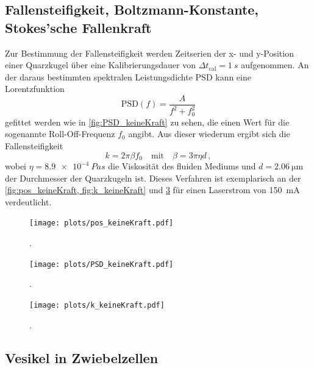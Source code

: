 \subsection{Fallensteifigkeit, Boltzmann-Konstante, Stokes'sche Fallenkraft}
    Zur Bestimmung der Fallensteifigkeit werden Zeitserien der x- und y-Position einer Quarzkugel über eine Kalibrierungsdauer von $\Delta t_{\mathrm{cal}} = \qty{1}{s}$ aufgenommen.
    An der daraus bestimmten spektralen Leistungsdichte PSD kann eine Lorentzfunktion
    \begin{equation*}
        \mathrm{PSD}(f) = \frac{A}{f^2 + f_0^2}
    \end{equation*}
    gefittet werden wie in \autoref{fig:PSD_keineKraft} zu sehen, die einen Wert für die sogenannte Roll-Off-Frequenz $f_0$ angibt.
    Aus dieser wiederum ergibt sich die Fallensteifigkeit
    \begin{equation*}
        k = 2 \pi \beta f_0 \quad \mathrm{mit} \quad \beta = 3 \pi \eta d \,,
    \end{equation*}
    wobei $\eta = \qty{8,9e-4}{Pa s}$ die Viskosität des fluiden Mediums und $d=\qty{2,06}{\um}$ der Durchmesser der Quarzkugeln ist.
    Dieses Verfahren ist exemplarisch an der \autoref{fig:pos_keineKraft, fig:k_keineKraft} und \ref{fig:k_keineKraft} für einen Laserstrom von \qty{150}{mA} verdeutlicht.
    \begin{figure}[ht]
        \centering\captionsetup{format=plain}
        \texttt{[image: plots/pos\_keineKraft.pdf]} \vspace*{-0.5cm}
        \caption{.}
        \label{fig:pos_keineKraft}
    \end{figure}
    \begin{figure}[ht]
        \centering\captionsetup{format=plain}
        \texttt{[image: plots/PSD\_keineKraft.pdf]} \vspace*{-0.5cm}
        \caption{.}
        \label{fig:PSD_keineKraft}
    \end{figure}
    \begin{figure}[ht]
        \centering\captionsetup{format=plain}
        \texttt{[image: plots/k\_keineKraft.pdf]} \vspace*{-0.5cm}
        \caption{.}
        \label{fig:k_keineKraft}
    \end{figure}
    \FloatBarrier

\subsection{Vesikel in Zwiebelzellen}

